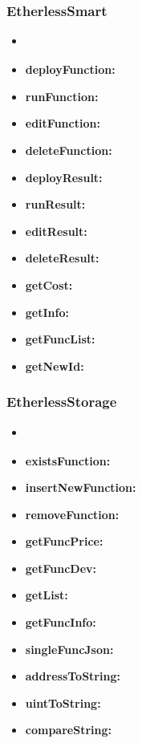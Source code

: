 \subsubsection{EtherlessSmart}
	\begin{itemize}
		\item \textbf{}
	\end{itemize}
	\begin{itemize}
		\item \textbf{deployFunction:}
		\item \textbf{runFunction:}
		\item \textbf{editFunction:}
		\item \textbf{deleteFunction:}
		\item \textbf{deployResult:}
		\item \textbf{runResult:}
		\item \textbf{editResult:}
		\item \textbf{deleteResult:}
		\item \textbf{getCost:}
		\item \textbf{getInfo:}
		\item \textbf{getFuncList:}
		\item \textbf{getNewId:}
	\end{itemize}
		
\subsubsection{EtherlessStorage}
	\begin{itemize}
		\item \textbf{}
	\end{itemize}
	\begin{itemize}
		\item \textbf{existsFunction:}
		\item \textbf{insertNewFunction:}
		\item \textbf{removeFunction:}
		\item \textbf{getFuncPrice:}
		\item \textbf{getFuncDev:}
		\item \textbf{getList:}
		\item \textbf{getFuncInfo:}
		\item \textbf{singleFuncJson:}
		\item \textbf{addressToString:}
		\item \textbf{uintToString:}
		\item \textbf{compareString:}
	\end{itemize}
		
